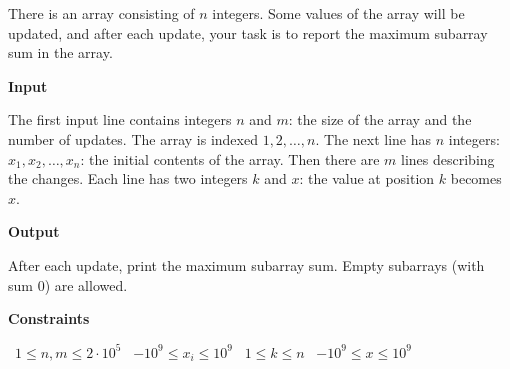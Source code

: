 There is an array consisting of $n$ integers. Some values of the array will be updated, and after each update, your task is to report the maximum subarray sum in the array.

\vspace{0.3cm}\noindent\textbf{Input}

The first input line contains integers $n$ and $m$: the size of the array and the number of updates. The array is indexed $1,2,\ldots,n$.
The next line has $n$ integers: $x_1,x_2,\ldots,x_n$: the initial contents of the array.
Then there are $m$ lines describing the changes. Each line has two integers $k$ and $x$: the value at position $k$ becomes $x$.

\vspace{0.3cm}\noindent\textbf{Output}

After each update, print the maximum subarray sum. Empty subarrays (with sum $0$) are allowed.

\vspace{0.3cm}\noindent\textbf{Constraints}

\textbullet\ $1 \le n, m \le 2 \cdot 10^5$
\textbullet\ $-10^9 \le x_i \le 10^9$
\textbullet\ $1 \le k \le n$
\textbullet\ $-10^9 \le x \le 10^9$